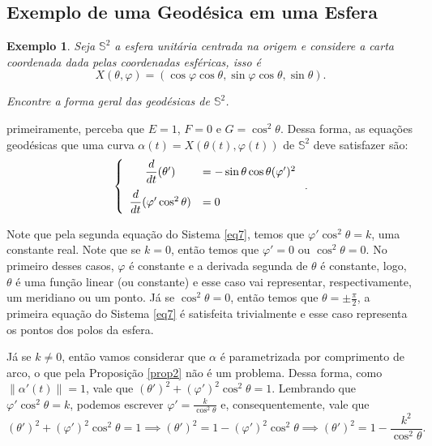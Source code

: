 \documentclass{article}
\newtheorem{example}{Exemplo}
\begin{document}


\subsection{Exemplo de uma Geodésica em uma Esfera}

\begin{example}
    Seja $\mathbb{S}^2$ a esfera unitária centrada na origem e considere a carta coordenada dada pelas coordenadas esféricas, isso é
    \[X(\theta, \varphi) = (\cos{\varphi}\cos{\theta}, \sin{\varphi}\cos{\theta}, \sin{\theta}).\]
    
    Encontre a forma geral das geodésicas de $\mathbb{S}^2$.
\end{example}
 primeiramente, perceba que $E = 1$, $F = 0$ e $G = \cos^2{\theta}$. Dessa forma, as equações geodésicas que uma curva $\alpha(t) = X(\theta(t), \varphi(t))$ de $\mathbb{S}^2$ deve satisfazer são:
\begin{equation}
    \label{eq7}
    \left\{\begin{array}{cl}
        \dfrac{d}{dt}(\theta') & = -\sin{\theta}\cos{\theta}(\varphi')^2 \vspace{6pt} \\
        \dfrac{d}{dt}(\varphi'\cos^2{\theta}) & = 0
    \end{array}\right..
\end{equation}

Note que pela segunda equação do Sistema \ref{eq7}, temos que $\varphi'\cos^2{\theta} = k$, uma constante real. Note que se $k = 0$, então temos que $\varphi' = 0$ ou $\cos^2{\theta} = 0$. No primeiro desses casos, $\varphi$ é constante e a derivada segunda de $\theta$ é constante, logo, $\theta$ é uma função linear (ou constante) e esse caso vai representar, respectivamente, um meridiano ou um ponto. Já se $\cos^2{\theta} = 0$, então temos que $\theta = \pm \frac{\pi}{2}$, a primeira equação do Sistema \ref{eq7} é satisfeita trivialmente e esse caso representa os pontos dos polos da esfera.

Já se $k\neq 0$, então vamos considerar que $\alpha$ é parametrizada por comprimento de arco, o que pela Proposição \ref{prop2} não é um problema. Dessa forma, como $\|\alpha'(t)\| = 1$, vale que $\left(\theta'\right)^2 + \left(\varphi'\right)^2\cos^2{\theta} = 1$. Lembrando que $\varphi'\cos^2{\theta} = k$, podemos escrever $\varphi' = \frac{k}{\cos^2{\theta}}$ e, consequentemente, vale que
\[\left(\theta'\right)^2 + \left(\varphi'\right)^2\cos^2{\theta} = 1\implies \left(\theta'\right)^2 = 1 - \left(\varphi'\right)^2\cos^2{\theta}\implies \left(\theta'\right)^2 = 1 - \dfrac{k^2}{\cos^2{\theta}}.\]
\end{document}
